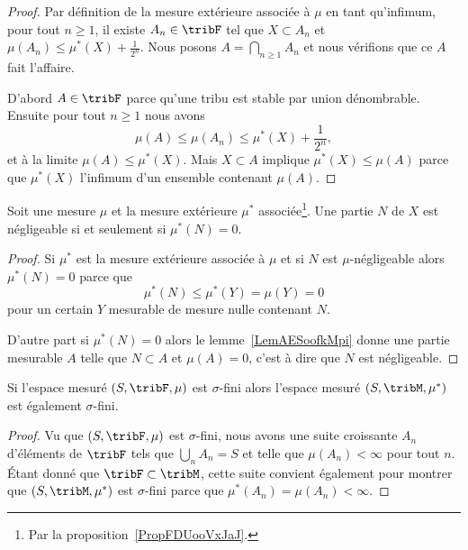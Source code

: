 \begin{proof}
    Par définition de la mesure extérieure associée à \( \mu\) en tant qu'infimum, pour tout \( n\geq 1\), il existe \( A_n\in\tribF\) tel que \( X\subset A_n\) et \( \mu(A_n)\leq \mu^*(X)+\frac{1}{ 2^n }\). Nous posons \( A=\bigcap_{n\geq 1}A_n\) et nous vérifions que ce \( A\) fait l'affaire.

    D'abord \( A\in\tribF\) parce qu'une tribu est stable par union dénombrable. Ensuite pour tout \( n\geq 1\) nous avons
    \begin{equation}
        \mu(A)\leq \mu(A_n)\leq \mu^*(X)+\frac{1}{ 2^n },
    \end{equation}
    et à la limite \( \mu(A)\leq \mu^*(X)\). Mais \( X\subset A\) implique \( \mu^*(X)\leq \mu(A)\) parce que \( \mu^*(X)\) l'infimum d'un ensemble contenant \( \mu(A)\).
\end{proof}

\begin{corollary}\label{LemXOUNooUbtpxm}
    Soit une mesure \( \mu\) et la mesure extérieure \( \mu^*\) associée\footnote{Par la proposition~\ref{PropFDUooVxJaJ}.}. Une partie \( N\) de \( X\) est négligeable si et seulement si \( \mu^*(N)=0\).
\end{corollary}

\begin{proof}
Si \( \mu^*\) est la mesure extérieure associée à \( \mu\) et si \( N\) est \( \mu\)-négligeable alors \( \mu^*(N)=0\) parce que
\begin{equation}
    \mu^*(N)\leq \mu^*(Y)=\mu(Y)=0
\end{equation}
pour un certain \( Y\) mesurable de mesure nulle contenant \( N\).

D'autre part si \( \mu^*(N)=0\) alors le lemme~\ref{LemAESoofkMpi} donne une partie mesurable \( A\) telle que \( N\subset A\) et \( \mu(A)=0\), c'est à dire que \( N\) est négligeable.
\end{proof}

\begin{lemma}       \label{LemOAEoocBDaO}
    Si l'espace mesuré \( (S,\tribF,\mu)\) est \( \sigma\)-fini alors l'espace mesuré \( (S,\tribM,\mu^*)\) est également \( \sigma\)-fini.
\end{lemma}

\begin{proof}
    Vu que \( (S,\tribF,\mu)\) est \( \sigma\)-fini, nous avons une suite croissante \( A_n\) d'éléments de \( \tribF\) tels que \( \bigcup_nA_n=S\) et telle que \( \mu(A_n)<\infty\) pour tout \( n\). Étant donné que \( \tribF\subset\tribM\), cette suite convient également pour montrer que \( (S,\tribM,\mu^*)\) est \( \sigma\)-fini parce que \( \mu^*(A_n)=\mu(A_n)<\infty\).
\end{proof}

